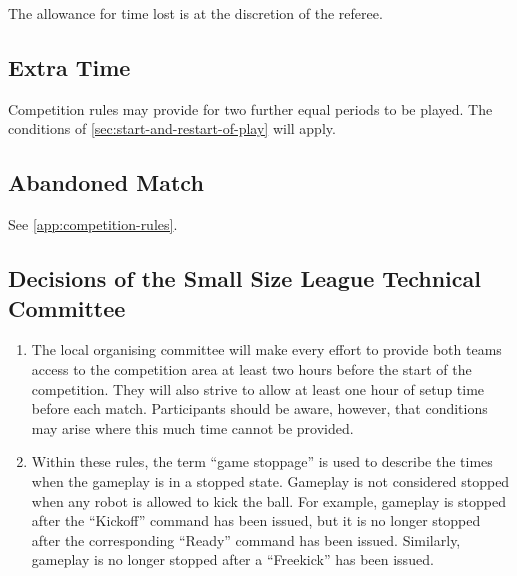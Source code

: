 The allowance for time lost is at the discretion of the referee.

\subsection{Extra Time}
Competition rules may provide for two further equal periods to be played.
The conditions of \autoref{sec:start-and-restart-of-play} will apply.

\subsection{Abandoned Match}
See \autoref{app:competition-rules}.

\subsection*{Decisions of the Small Size League Technical Committee}
\begin{enumerate}
\item
The local organising committee will make every effort to provide both teams access to the competition area at least two hours before the start of the competition.
They will also strive to allow at least one hour of setup time before each match.
Participants should be aware, however, that conditions may arise where this much time cannot be provided.

\item
Within these rules, the term ``game stoppage'' is used to describe the times when the gameplay is in a stopped state.
Gameplay is not considered stopped when any robot is allowed to kick the ball.
For example, gameplay is stopped after the ``Kickoff'' command has been issued, but it is no longer stopped after the corresponding ``Ready'' command has been issued.
Similarly, gameplay is no longer stopped after a ``Freekick'' has been issued.
\end{enumerate}

